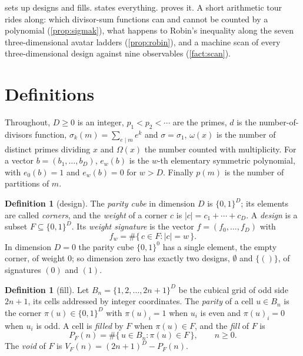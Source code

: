 \documentclass[11pt]{amsart}
\theoremstyle{definition}
\newtheorem{definition}[theorem]{Definition}
\theoremstyle{remark}
\begin{document}
 sets up designs and fills.  states everything.  proves it. A short arithmetic tour rides along: which divisor-sum functions can and cannot be counted by a polynomial (\cref{prop:sigmak}), what happens to Robin's inequality along the seven three-dimensional avatar ladders (\cref{prop:robin}), and a machine scan of every three-dimensional design against nine observables (\cref{fact:scan}).

\section{Definitions}
\label{sec:def}

Throughout, $D \ge 0$ is an integer, $p_{1} < p_{2} < \cdots$ are the primes, $d$ is the number-of-divisors function, $\sigma_{k}(m)=\sum_{e \mid m} e^{k}$ and $\sigma = \sigma_{1}$, $\omega(x)$ is the number of distinct primes dividing $x$ and $\Omega(x)$ the number counted with multiplicity. For a vector $b=(b_{1},\dots,b_{D})$, $e_{w}(b)$ is the $w$-th elementary symmetric polynomial, with $e_{0}(b)=1$ and $e_{w}(b)=0$ for $w>D$. Finally $p(m)$ is the number of partitions of $m$.

\begin{definition}[design]
\label{def:design}
The \emph{parity cube} in dimension $D$ is $\{0,1\}^{D}$; its elements are called \emph{corners}, and the \emph{weight} of a corner $c$ is $|c| = c_{1}+\cdots+c_{D}$. A \emph{design} is a subset $F \subseteq \{0,1\}^{D}$. Its \emph{weight signature} is the vector $f=(f_{0},\dots,f_{D})$ with
\[
  f_{w} = \#\{\,c \in F : |c| = w\,\}.
\]
In dimension $D=0$ the parity cube $\{0,1\}^{0}$ has a single element, the empty corner, of weight $0$; so dimension zero has exactly two designs, $\emptyset$ and $\{()\}$, of signatures $(0)$ and $(1)$.
\end{definition}

\begin{definition}[fill]
\label{def:fill}
Let $B_{n} = \{1,2,\dots,2n+1\}^{D}$ be the cubical grid of odd side $2n+1$, its cells addressed by integer coordinates. The \emph{parity} of a cell $u \in B_{n}$ is the corner $\pi(u) \in \{0,1\}^{D}$ with $\pi(u)_{i}=1$ when $u_{i}$ is even and $\pi(u)_{i}=0$ when $u_{i}$ is odd. A cell is \emph{filled} by $F$ when $\pi(u) \in F$, and the \emph{fill} of $F$ is
\[
  P_{F}(n) = \#\{\, u \in B_{n} : \pi(u) \in F \,\}, \qquad n \ge 0 .
\]
The \emph{void} of $F$ is $V_{F}(n) = (2n+1)^{D} - P_{F}(n)$.
\end{definition}
\end{document}
